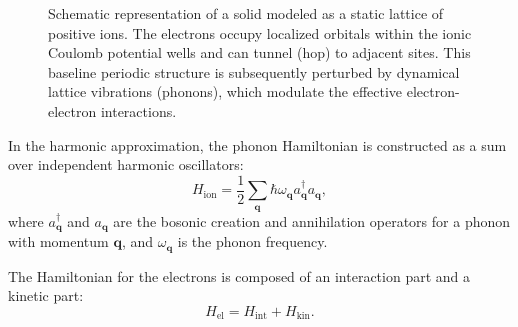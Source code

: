 \begin{figure}[H]
    \centering
    \caption{Schematic representation of a solid modeled as a static lattice of positive ions. The electrons occupy localized orbitals within the ionic Coulomb potential wells and can tunnel (hop) to adjacent sites. This baseline periodic structure is subsequently perturbed by dynamical lattice vibrations (phonons), which modulate the effective electron-electron interactions.}
    \label{fig:lattice_hopping}
\end{figure}

In the harmonic approximation, the phonon Hamiltonian is constructed as a sum over independent harmonic oscillators:
\[
    H_{\text{ion}} = \frac{1}{2} \sum_{\mathbf{q}} \hbar\omega_{\mathbf{q}} a_{\mathbf{q}}^\dagger a_{\mathbf{q}},
\]
where \(a_{\mathbf{q}}^\dagger\) and \(a_{\mathbf{q}}\) are the bosonic creation and annihilation operators for a phonon with momentum \(\mathbf{q}\), and \(\omega_{\mathbf{q}}\) is the phonon frequency.

The Hamiltonian for the electrons is composed of an interaction part and a kinetic part:
\[
    H_{\text{el}} = H_{\text{int}} + H_{\text{kin}}.
\]

